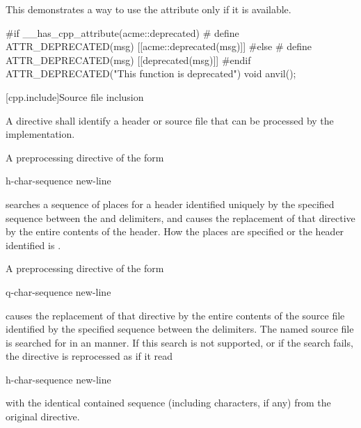 \pnum
\begin{example}
This demonstrates a way to use the attribute 
only if it is available.
\begin{codeblock}
#if __has_cpp_attribute(acme::deprecated)
#  define ATTR_DEPRECATED(msg) [[acme::deprecated(msg)]]
#else
#  define ATTR_DEPRECATED(msg) [[deprecated(msg)]]
#endif
ATTR_DEPRECATED("This function is deprecated") void anvil();
\end{codeblock}
\end{example}

[cpp.include]{Source file inclusion}
%
%

\pnum
A
directive shall identify a header or source file
that can be processed by the implementation.

\pnum
A preprocessing directive of the form
\begin{ncsimplebnf}
 h-char-sequence \terminal{>} new-line
\end{ncsimplebnf}
searches a sequence of
places
for a header identified uniquely by the specified sequence
between the
\tcode{<}
and
\tcode{>}
delimiters,
and causes the replacement of that
directive by the entire contents of the header.
How the places are specified
or the header identified
is .

\pnum
A preprocessing directive of the form
\begin{ncsimplebnf}
 q-char-sequence  new-line
\end{ncsimplebnf}
causes the replacement of that
directive by the entire contents of the
source file identified by the specified sequence between the
delimiters.
The named source file is searched for in an
manner.
If this search is not supported,
or if the search fails,
the directive is reprocessed as if it read
\begin{ncsimplebnf}
 h-char-sequence \terminal{>} new-line
\end{ncsimplebnf}
with the identical contained sequence (including
\tcode{>}
characters, if any) from the original directive.

